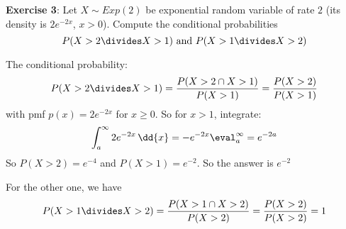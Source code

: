 \documentclass{article}
\begin{document}
\textbf{Exercise 3}: Let $X \sim Exp(2)$ be exponential random variable of rate $2$ (its density is $2e^{-2x}$, $x > 0$). Compute the conditional probabilities
    \begin{equation*}
        P(X > 2 \divides X > 1) \text{ and } P(X > 1 \divides X > 2)
    \end{equation*}
    \begin{answer}
        The conditional probability:
            \begin{equation*}
                P(X > 2 \divides X > 1) = \dfrac{P(X > 2 \cap X > 1)}{P(X > 1)} = \dfrac{P(X > 2)}{P(X > 1)}
            \end{equation*}
        with pmf $p(x) = 2e^{-2x}$ for $x \geq 0$. So for $x > 1$, integrate:
            \begin{equation*}
                \int_{a}^{\infty} 2e^{-2x} \, \dd{x} = -e^{-2x} \eval_{a}^{\infty} = e^{-2a}
            \end{equation*}
        So $P(X > 2) = e^{-4}$ and $P(X > 1) = e^{-2}$. So the answer is $e^{-2}$

        For the other one, we have
            \begin{equation*}
                P(X > 1 \divides X > 2) = \dfrac{P(X > 1 \cap X > 2)}{P(X > 2)} = \dfrac{P(X > 2)}{P(X > 2)} = 1
            \end{equation*}
    \end{answer}
\end{document}
